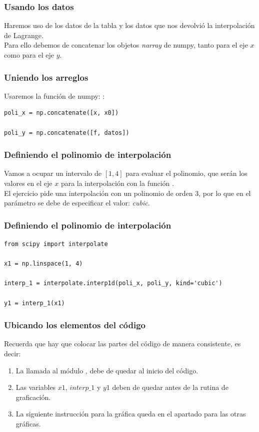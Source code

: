 \documentclass[12pt]{beamer}
\begin{document}
\begin{frame}
\frametitle{Usando los datos}
Haremos uso de los datos de la tabla y los datos que nos devolvió la interpolación de Lagrange.
\\
\bigskip
\pause
Para ello debemos de concatenar los objetos \textit{narray} de numpy, tanto para el eje $x$ como para el eje $y$.
\end{frame}
\begin{frame}[fragile]
\frametitle{Uniendo los arreglos}
Usaremos la función de numpy: :
\begin{lstlisting}[caption=Uniendo los arreglos]
poli_x = np.concatenate([x, x0])

poli_y = np.concatenate([f, datos])
\end{lstlisting}
\end{frame}
\begin{frame}[fragile]
\frametitle{Definiendo el polinomio de interpolación}
Vamos a ocupar un intervalo de $[1, 4]$ para evaluar el polinomio, que serán los valores en el eje $x$ para la interpolación con la función .
\\
\bigskip
\pause
El ejercicio pide una interpolación con un polinomio de orden $3$, por lo que en el parámetro  se debe de especificar el valor: \textit{cubic}.
\end{frame}
\begin{frame}[fragile]
\frametitle{Definiendo el polinomio de interpolación}
\begin{lstlisting}[caption=Definiendo el polinomio]
from scipy import interpolate

x1 = np.linspace(1, 4)

interp_1 = interpolate.interp1d(poli_x, poli_y, kind='cubic')

y1 = interp_1(x1)
\end{lstlisting}
\end{frame}
\begin{frame}
\frametitle{Ubicando los elementos del código}
Recuerda que hay que colocar las partes del código de manera consistente, es decir:
\begin{enumerate}[<+->]
\item La llamada al módulo , debe de quedar al inicio del código.
\item Las variables $x1$, $interp\_1$ y $y1$ deben de quedar antes de la rutina de graficación.
\item La siguiente instrucción para la gráfica queda en el apartado para las otras gráficas.
\end{enumerate}
\end{frame}
\end{document}
